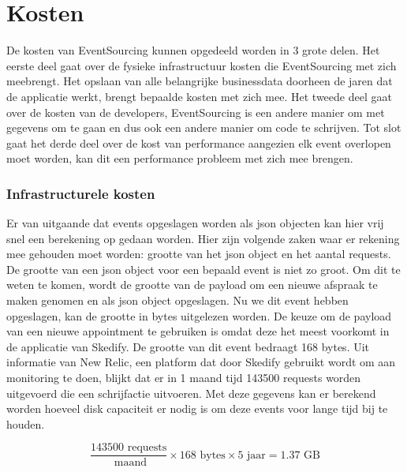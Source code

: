 
\chapter{Kosten}
\label{ch:kosten}

De kosten van EventSourcing kunnen opgedeeld worden in 3 grote delen. Het eerste deel gaat over de fysieke infrastructuur kosten die EventSourcing met zich meebrengt. Het opslaan van alle belangrijke businessdata doorheen de jaren dat de applicatie werkt, brengt bepaalde kosten met zich mee. Het tweede deel gaat over de kosten van de developers, EventSourcing is een andere manier om met gegevens om te gaan en dus ook een andere manier om code te schrijven. Tot slot gaat het derde deel over de kost van performance aangezien elk event overlopen moet worden, kan dit een performance probleem met zich mee brengen.

\subsection{Infrastructurele kosten}
\label{subsec:infrastructurele-kosten}

Er van uitgaande dat events opgeslagen worden als \gls{json} objecten kan hier vrij snel een berekening op gedaan worden. Hier zijn volgende zaken waar er rekening mee gehouden moet worden: grootte van het \gls{json} object en het aantal requests.
De grootte van een \gls{json} object voor een bepaald event is niet zo groot. Om dit te weten te komen, wordt de grootte van de \gls{payload} om een nieuwe afspraak te maken genomen en als \gls{json} object opgeslagen. Nu we dit event hebben opgeslagen, kan de grootte in bytes uitgelezen worden. De keuze om de payload van een nieuwe appointment te gebruiken is omdat deze het meest voorkomt in de applicatie van Skedify. De grootte van dit event bedraagt 168 bytes.
Uit informatie van New Relic, een platform dat door Skedify gebruikt wordt om aan monitoring te doen, blijkt dat er in 1 maand tijd 143500 requests worden uitgevoerd die een schrijfactie uitvoeren.
Met deze gegevens kan er berekend worden hoeveel disk capaciteit er nodig is om deze events voor lange tijd bij te houden.

\begin{equation}
\frac{143 500 \text{ requests}}{\text{ maand}} \times 168 \text{ bytes} \times 5 \text{ jaar} = 1.37 \text{ GB} 
\end{equation}


